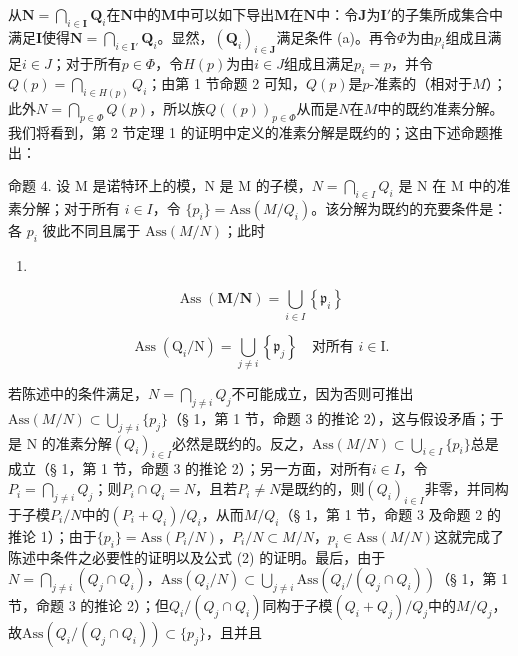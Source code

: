 从\(\mathbf{N} = \bigcap_{i\in \mathbf{I}}\mathbf{Q}_i\)在\(\mathbf{N}\)中的\(\mathbf{M}\)中可以如下导出\(\mathbf{M}\)在\(\mathbf{N}\)中：令\(\mathbf{J}\)为\(\mathbf{I}'\)的子集所成集合中满足\(\mathbf{I}\)使得\(\mathbf{N} = \bigcap_{i\in \mathbf{I}'}\mathbf{Q}_i\)。显然，\((\mathbf{Q}_i)_{i\in \mathbf{J}}\)满足条件 (a)。再令\(\Phi\)为由\(p_i\)组成且满足\(i\in J\)；对于所有\(p\in \Phi\)，令\(H(p)\)为由\(i\in J\)组成且满足\(p_i = p\)，并令\(Q(p) = \bigcap_{i\in H(p)}Q_i\)；由第 1 节命题 2 可知，\(Q(p)\)是\(p\)-准素的（相对于\(M\)）；此外\(N = \bigcap_{p\in \Phi}Q(p)\)，所以族\(Q((p))_{p\in \Phi}\)从而是\(N\)在\(M\)中的既约准素分解。我们将看到，第 2 节定理 1 的证明中定义的准素分解是既约的；这由下述命题推出：

命题 4. 设 M 是诺特环上的模，N 是 M 的子模，\(N = \bigcap_{i \in I} Q_i\) 是 N 在 M 中的准素分解；对于所有 \(i \in I\)，令 \(\{p_i\} = \text{Ass}(M/Q_i)\)。该分解为既约的充要条件是：各 \(p_i\) 彼此不同且属于 \(\text{Ass}(M/N)\)；此时

\begin{enumerate}
\def\labelenumi{(\arabic{enumi})}
\setcounter{enumi}{1}
\tightlist
\item
\end{enumerate}

\[
\operatorname{Ass} (\mathbf {M} / \mathbf {N}) = \bigcup_ {i \in I} \left\{\mathfrak {p} _ {i} \right\}\tag{3}
\]

\[
\operatorname{Ass} \left(\mathrm{Q} _ {i} / \mathrm{N}\right) = \bigcup_ {j \neq i} \left\{\mathfrak {p} _ {j} \right\} \quad \text{对所有 } i \in \mathrm{I}.
\]

若陈述中的条件满足，\(N = \bigcap_{j \neq i} Q_j\)不可能成立，因为否则可推出\(\text{Ass}(M/N) \subset \bigcup_{j \neq i} \{p_j\}\)（§ 1，第 1 节，命题 3 的推论 2），这与假设矛盾；于是 N 的准素分解\((Q_i)_{i \in I}\)必然是既约的。反之，\(\text{Ass}(M/N) \subset \bigcup_{i \in I} \{p_i\}\)总是成立（§ 1，第 1 节，命题 3 的推论 2）；另一方面，对所有\(i \in I\)，令\(P_i = \bigcap_{j \neq i} Q_j\)；则\(P_i \cap Q_i = N\)，且若\(P_i \neq N\)是既约的，则\((Q_i)_{i \in I}\)非零，并同构于子模\(P_i/N\)中的\((P_i + Q_i)/Q_i\)，从而\(M/Q_i\)（§ 1，第 1 节，命题 3 及命题 2 的推论 1）；由于\(\{p_i\} = \text{Ass}(P_i/N)\)，\(P_i/N \subset M/N\)，\(p_i \in \text{Ass}(M/N)\)这就完成了陈述中条件之必要性的证明以及公式 (2) 的证明。最后，由于\(N = \bigcap_{j \neq i} (Q_j \cap Q_i)\)，\(\text{Ass}(Q_i/N) \subset \bigcup_{j \neq i} \text{Ass}(Q_i/(Q_j \cap Q_i))\)（§ 1，第 1 节，命题 3 的推论 2）；但\(Q_i/(Q_j \cap Q_i)\)同构于子模\((Q_i + Q_j)/Q_j\)中的\(M/Q_j\)，故\(\text{Ass}(Q_i/(Q_j \cap Q_i)) \subset \{p_j\}\)，且并且

